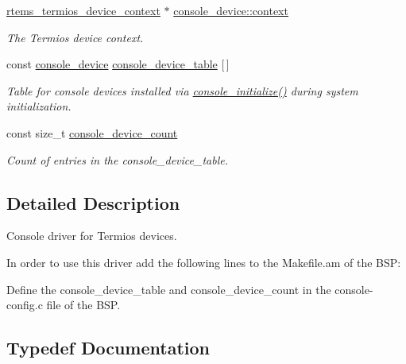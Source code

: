 \begin{DoxyCompactItemize}
\mbox{\hyperlink{structrtems__termios__device__context}{rtems\+\_\+termios\+\_\+device\+\_\+context}} $\ast$ \mbox{\hyperlink{group__ConsoleTermios_ga3dfebeb03f639f0c27e52128404b7141}{console\+\_\+device\+::context}}
\begin{DoxyCompactList}\small\item\em The Termios device context. \end{DoxyCompactList}\item 
const \mbox{\hyperlink{structconsole__device}{console\+\_\+device}} \mbox{\hyperlink{group__ConsoleTermios_ga7f058e756eb724397922b823131fba5c}{console\+\_\+device\+\_\+table}} \mbox{[}$\,$\mbox{]}
\begin{DoxyCompactList}\small\item\em Table for console devices installed via \mbox{\hyperlink{arm_2raspberrypi_2console_2console-config_8c_a4bdc321ef3ab62a261d77b5dbe075566}{console\+\_\+initialize()}} during system initialization. \end{DoxyCompactList}\item 
const size\+\_\+t \mbox{\hyperlink{group__ConsoleTermios_gabca2c9c9873b0482f9fd306e6bade017}{console\+\_\+device\+\_\+count}}
\begin{DoxyCompactList}\small\item\em Count of entries in the console\+\_\+device\+\_\+table. \end{DoxyCompactList}\end{DoxyCompactItemize}


\subsection{Detailed Description}
Console driver for Termios devices. 

In order to use this driver add the following lines to the Makefile.\+am of the B\+SP\+:


\begin{DoxyCode}{0}
\end{DoxyCode}


Define the console\+\_\+device\+\_\+table and console\+\_\+device\+\_\+count in the console-\/config.\+c file of the B\+SP. 

\subsection{Typedef Documentation}
\mbox{\label{group__ConsoleTermios_ga256c0a60dec13fd909e708ca271de6f1}} 
